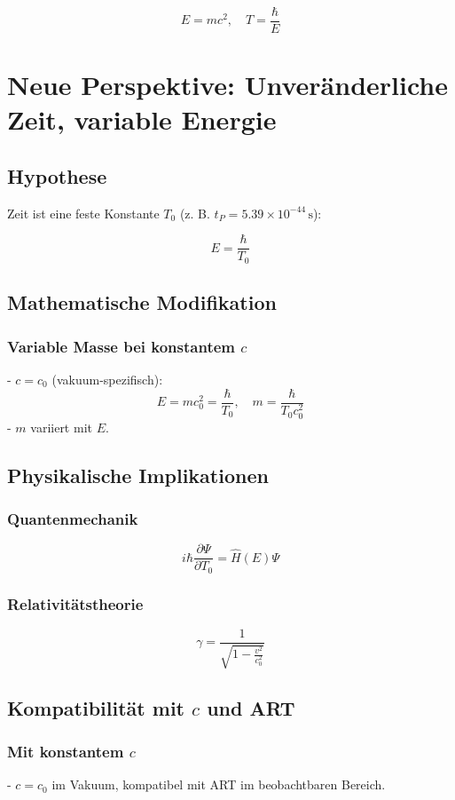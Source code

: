 \documentclass{article}
\begin{document}
	\[
	E = mc^2, \quad T = \frac{\hbar}{E}
	\]
	
	\section{Neue Perspektive: Unveränderliche Zeit, variable Energie}
	
	\subsection{Hypothese}
	
	Zeit ist eine feste Konstante \( T_0 \) (z. B. \( t_P = 5.39 \times 10^{-44} \, \text{s} \)):
	
	\[
	E = \frac{\hbar}{T_0}
	\]
	
	\subsection{Mathematische Modifikation}
	
	\subsubsection{Variable Masse bei konstantem \( c \)}
	- \( c = c_0 \) (vakuum-spezifisch):
	\[
	E = m c_0^2 = \frac{\hbar}{T_0}, \quad m = \frac{\hbar}{T_0 c_0^2}
	\]
	- \( m \) variiert mit \( E \).
	
	\subsection{Physikalische Implikationen}
	
	\subsubsection{Quantenmechanik}
	\[
	i\hbar \frac{\partial \Psi}{\partial T_0} = \hat{H}(E) \Psi
	\]
	
	\subsubsection{Relativitätstheorie}
	\[
	\gamma = \frac{1}{\sqrt{1 - \frac{v^2}{c_0^2}}}
	\]
	
	\subsection{Kompatibilität mit \( c \) und ART}
	
	\subsubsection{Mit konstantem \( c \)}
	- \( c = c_0 \) im Vakuum, kompatibel mit ART im beobachtbaren Bereich.
	
\end{document}
